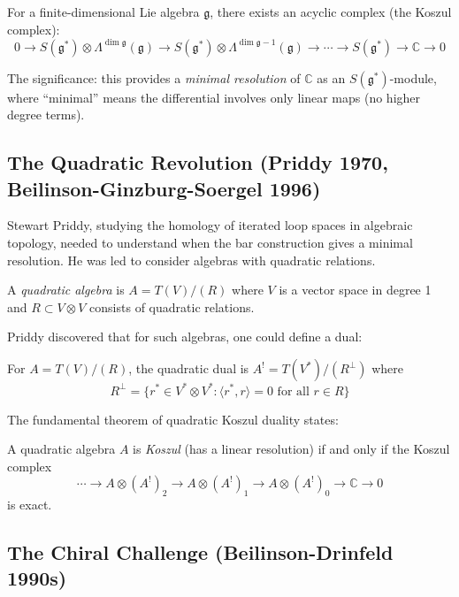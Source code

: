\begin{theorem}[Koszul 1950]
For a finite-dimensional Lie algebra $\mathfrak{g}$, there exists an acyclic complex (the Koszul complex):
\[
0 \to S(\mathfrak{g}^*) \otimes \Lambda^{\dim \mathfrak{g}}(\mathfrak{g}) \to S(\mathfrak{g}^*) \otimes \Lambda^{\dim \mathfrak{g}-1}(\mathfrak{g}) \to \cdots \to S(\mathfrak{g}^*) \to \mathbb{C} \to 0
\]
\end{theorem}

The significance: this provides a \emph{minimal resolution} of $\mathbb{C}$ as an $S(\mathfrak{g}^*)$-module, where ``minimal'' means the differential involves only linear maps (no higher degree terms).

\subsection{The Quadratic Revolution (Priddy 1970, Beilinson-Ginzburg-Soergel 1996)}

Stewart Priddy, studying the homology of iterated loop spaces in algebraic topology, needed to understand when the bar construction gives a minimal resolution. He was led to consider algebras with quadratic relations.

\begin{definition}
A \emph{quadratic algebra} is $A = T(V)/(R)$ where $V$ is a vector space in degree 1 and $R \subset V \otimes V$ consists of quadratic relations.
\end{definition}

Priddy discovered that for such algebras, one could define a dual:

\begin{definition}
For $A = T(V)/(R)$, the quadratic dual is $A^! = T(V^*)/(R^{\perp})$ where
\[
R^{\perp} = \{r^* \in V^* \otimes V^* : \langle r^*, r \rangle = 0 \text{ for all } r \in R\}
\]
\end{definition}

The fundamental theorem of quadratic Koszul duality states:

\begin{theorem}
A quadratic algebra $A$ is \emph{Koszul} (has a linear resolution) if and only if the Koszul complex
\[
\cdots \to A \otimes (A^!)_2 \to A \otimes (A^!)_1 \to A \otimes (A^!)_0 \to \mathbb{C} \to 0
\]
is exact.
\end{theorem}

\subsection{The Chiral Challenge (Beilinson-Drinfeld 1990s)}

